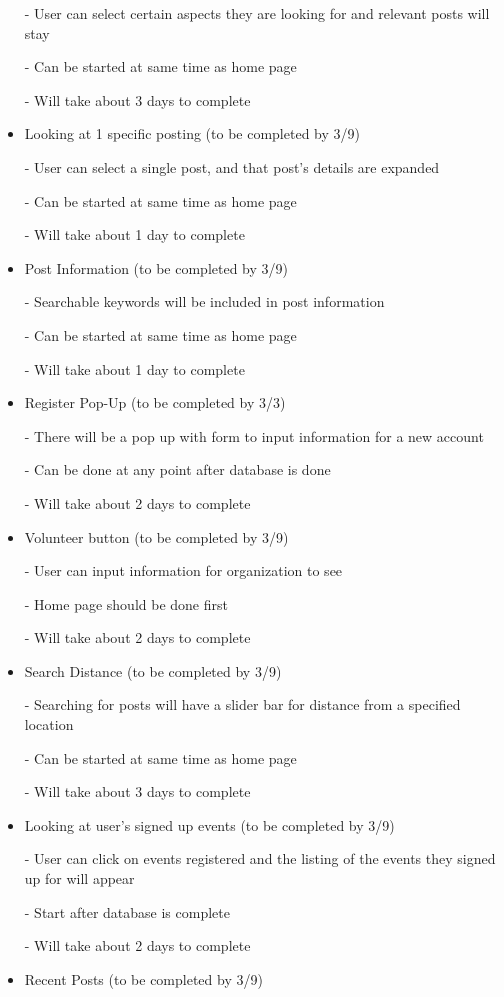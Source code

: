 \documentclass[12pt]{article}
\begin{document}
\begin{itemize}
	- User can select certain aspects they are looking for and relevant posts will stay

	- Can be started at same time as home page

	- Will take about 3 days to complete
\item
	Looking at 1 specific posting (to be completed by 3/9)

	- User can select a single post, and that post's details are expanded

	- Can be started at same time as home page

	- Will take about 1 day to complete
\item
	Post Information (to be completed by 3/9)

	- Searchable keywords will be included in post information

	- Can be started at same time as home page

	- Will take about 1 day to complete
\item
	Register Pop-Up (to be completed by 3/3)

	- There will be a pop up with form to input information for a new account

	- Can be done at any point after database is done

	- Will take about 2 days to complete
\item
	Volunteer button (to be completed by 3/9)

	- User can input information for organization to see

	- Home page should be done first

	- Will take about 2 days to complete
\item
	Search Distance (to be completed by 3/9)

	- Searching for posts will have a slider bar for distance from a specified location

	- Can be started at same time as home page

	- Will take about 3 days to complete
\item
	Looking at user's signed up events (to be completed by 3/9)

	- User can click on events registered and the listing of the events they signed up for will appear

	- Start after database is complete

	- Will take about 2 days to complete
\item
	Recent Posts (to be completed by 3/9)


\end{itemize}
\end{document}
